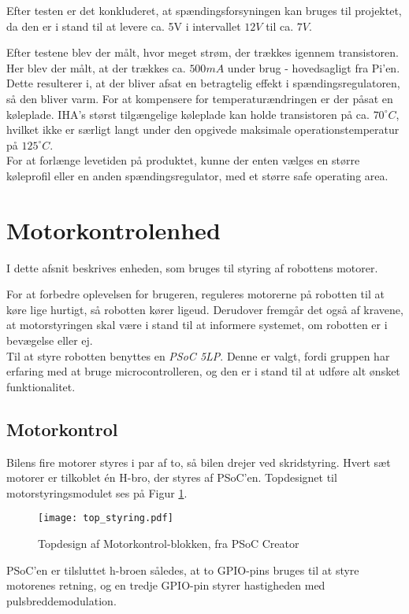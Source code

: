 Efter testen er det konkluderet, at spændingsforsyningen kan bruges til projektet, da den er i stand til at levere ca. 5V i intervallet $12 V$ til ca. $7 V$.

Efter testene blev der målt, hvor meget strøm, der trækkes igennem transistoren. Her blev der målt, at der trækkes  ca. $500 mA$ under brug - hovedsagligt fra Pi'en.
Dette resulterer i, at der bliver afsat en betragtelig effekt i spændingsregulatoren, så den bliver varm. 
For at kompensere for temperaturændringen er der påsat en køleplade. 
IHA's størst tilgængelige køleplade kan holde transistoren på ca. $70^{\circ}C$, hvilket ikke er særligt langt under den opgivede maksimale operationstemperatur på $125^{\circ}C$. \\
For at forlænge levetiden på produktet, kunne der enten vælges en større køleprofil eller en anden spændingsregulator, med et større safe operating area.
\newpage
\section{Motorkontrolenhed}
I dette afsnit beskrives enheden, som bruges til styring af robottens motorer. 

For at forbedre oplevelsen for brugeren, reguleres motorerne på robotten til at køre lige hurtigt, så robotten kører ligeud.
Derudover fremgår det også af kravene, at motorstyringen skal være i stand til at informere systemet, om robotten er i bevægelse eller ej. \\
Til at styre robotten benyttes en \textit{PSoC 5LP}. 
Denne er valgt, fordi gruppen har erfaring med at bruge microcontrolleren, og den er i stand til at udføre alt ønsket funktionalitet.
 

\subsection{Motorkontrol}
Bilens fire motorer styres i par af to, så bilen drejer ved skridstyring. 
Hvert sæt motorer er tilkoblet én H-bro, der styres af PSoC'en. 
Topdesignet til motorstyringsmodulet ses på Figur \ref{fig:top_styring}.

\begin{figure}[H] 
\centering
\texttt{[image: top\_styring.pdf]}
\caption{Topdesign af Motorkontrol-blokken, fra PSoC Creator}
\label{fig:top_styring}
\end{figure}

PSoC'en er tilsluttet h-broen således, at to GPIO-pins bruges til at styre motorenes retning, og en tredje GPIO-pin styrer hastigheden med pulsbreddemodulation.

